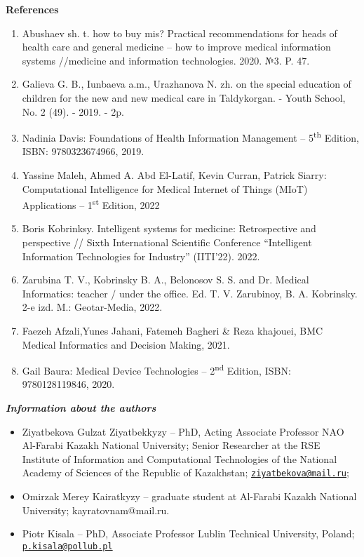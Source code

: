 {\bfseries References}

\begin{enumerate}
\def\labelenumi{\arabic{enumi}.}
\item
  Abushaev sh. t. how to buy mis? Practical recommendations for heads of
  health care and general medicine -- how to improve medical information
  systems //medicine and information technologies. 2020. №3. P. 47.
\item
  Galieva G. B., Iunbaeva a.m., Urazhanova N. zh. on the special
  education of children for the new and new medical care in Taldykorgan.
  - Youth School, No. 2 (49). - 2019. - 2p.
\item
  Nadinia Davis: Foundations of Health Information Management --
  5\textsuperscript{th} Edition, ISBN: 9780323674966, 2019.
\item
  Yassine Maleh, Ahmed A. Abd El-Latif, Kevin Curran, Patrick Siarry:
  Computational Intelligence for Medical Internet of Things (MIoT)
  Applications -- 1\textsuperscript{st} Edition, 2022
\item
  Boris Kobrinksy. Intelligent systems for medicine: Retrospective and
  perspective // Sixth International Scientific Conference ``Intelligent
  Information Technologies for Industry'' (IITI'22). 2022.
\item
  Zarubina T. V., Kobrinsky B. A., Belonosov S. S. and Dr. Medical
  Informatics: teacher / under the office. Ed. T. V. Zarubinoy, B. A.
  Kobrinsky. 2-e izd. M.: Geotar-Media, 2022.
\item
  Faezeh Afzali,Yunes Jahani, Fatemeh Bagheri \& Reza khajouei, BMC
  Medical Informatics and Decision Making, 2021.
\item
  Gail Baura: Medical Device Technologies -- 2\textsuperscript{nd}
  Edition, ISBN: 9780128119846, 2020.
\end{enumerate}

\emph{{\bfseries Information about the authors}}


\begin{itemize}
\item
Ziyatbekova Gulzat Ziyatbekkyzy -- PhD, Acting Associate Professor NAO
Al-Farabi Kazakh National University; Senior Researcher at the RSE
Institute of Information and Computational Technologies of the National
Academy of Sciences of the Republic of Kazakhstan;
\href{mailto:ziyatbekova@mail.ru}{\nolinkurl{ziyatbekova@mail.ru}};

\item
Omirzak Merey Kairatkyzy -- graduate student at Al-Farabi Kazakh
National University; kayratovnam@mail.ru.

\item
Piotr Kisala -- PhD, Associate Professor Lublin Technical University,
Poland; \href{mailto:p.kisala@pollub.pl}{\nolinkurl{p.kisala@pollub.pl}}
\end{itemize}

